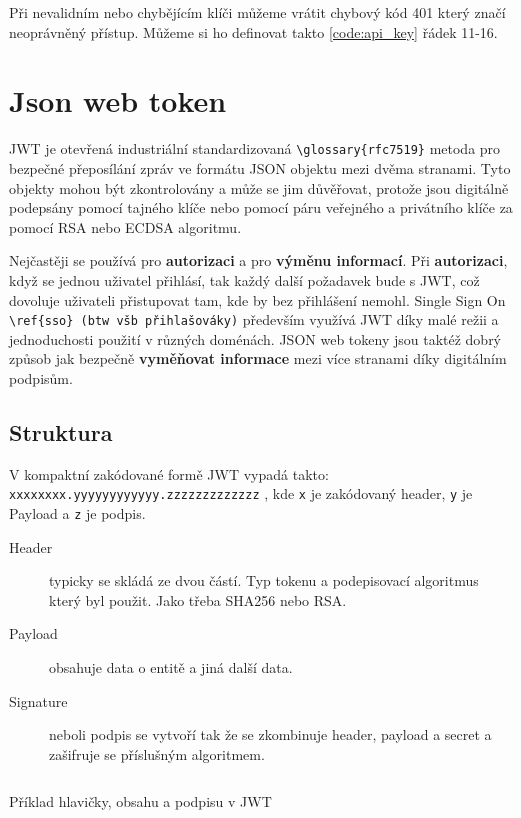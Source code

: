 Při nevalidním nebo chybějícím klíči můžeme vrátit chybový kód 401 který značí neoprávněný přístup. Můžeme si ho definovat takto \ref{code:api_key} řádek 11-16.





\section{Json web token}
JWT je otevřená industriální standardizovaná \verb|\glossary{rfc7519}| metoda pro bezpečné přeposílání zpráv ve formátu JSON objektu mezi dvěma stranami.
Tyto objekty mohou být zkontrolovány a může se jim důvěřovat, protože jsou digitálně podepsány pomocí tajného klíče nebo pomocí páru veřejného a privátního klíče za pomocí RSA nebo ECDSA algoritmu.

Nejčastěji se používá pro \textbf{autorizaci} a pro \textbf{výměnu informací}. Při \textbf{autorizaci}, když se jednou uživatel přihlásí, tak každý další požadavek bude s JWT, což dovoluje uživateli přistupovat tam, kde by bez přihlášení nemohl. Single Sign On \verb|\ref{sso} (btw všb přihlašováky)| především využívá JWT díky malé režii a jednoduchosti použití v různých doménách. JSON web tokeny jsou taktéž dobrý způsob jak bezpečně \textbf{vyměňovat informace} mezi více stranami díky digitálním podpisům.

\subsection{Struktura}
V kompaktní zakódované formě JWT vypadá takto: \texttt{xxxxxxxx.yyyyyyyyyyyy.zzzzzzzzzzzzz} , kde \texttt{x} je zakódovaný header, \texttt{y} je Payload a \texttt{z} je podpis.

\begin{description}
    \item[Header] typicky se skládá ze dvou částí. Typ tokenu a podepisovací algoritmus který byl použit. Jako třeba SHA256 nebo RSA.
    \item[Payload] obsahuje data o entitě a jiná další data.
    \item[Signature] neboli podpis se vytvoří tak že se zkombinuje header, payload a secret a zašifruje se příslušným algoritmem.
\end{description}

\begin{listing}[ht]
    \inputminted[]{json}{resources/code/security/JWT.jsonc}
    \caption{Příklad hlavičky, obsahu a podpisu v JWT} %
    \label{code:JWT_example}
\end{listing}





